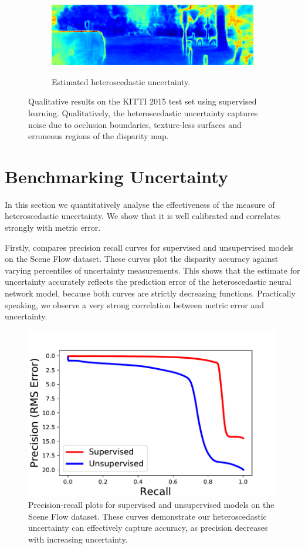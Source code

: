 \begin{figure}[p]
\begin{center}
\begin{subfigure}[t]{\linewidth}
{			\includegraphics[width=0.33\linewidth]{uncertainty/000167_10_png_uncertainty.png}}
	        \caption{Estimated heteroscedastic uncertainty.}
		\end{subfigure}
	\end{center}
	\caption[Qualitative results on the KITTI 2015 test set using supervised learning.]{Qualitative results on the KITTI 2015 test set using supervised learning. Qualitatively, the heteroscedastic uncertainty captures noise due to occlusion boundaries, texture-less surfaces and erroneous regions of the disparity map.}
	\label{fig:results_qualitative_kitti}
\end{figure}

\section{Benchmarking Uncertainty}
\label{sec:experiments}

In this section we quantitatively analyse the effectiveness of the measure of heteroscedastic uncertainty. We show that it is well calibrated and correlates strongly with metric error.

Firstly,  compares precision recall curves for supervised and unsupervised models on the Scene Flow dataset. These curves plot the disparity accuracy against varying percentiles of uncertainty measurements. This shows that the estimate for uncertainty accurately reflects the prediction error of the heteroscedastic neural network model, because both curves are strictly decreasing functions. Practically speaking, we observe a very strong correlation between metric error and uncertainty.

\begin{figure}[h]
\centering
\includegraphics[width=0.5\linewidth,trim={0 0 0 3em},clip]{uncertainty/regression_precision_recall}
\caption[Precision-recall plots.]{Precision-recall plots for supervised and unsupervised models on the Scene Flow dataset. These curves demonstrate our heteroscedastic uncertainty can effectively capture accuracy, as precision decreases with increasing uncertainty.}
\label{fig:precision_recall}
\end{figure}

